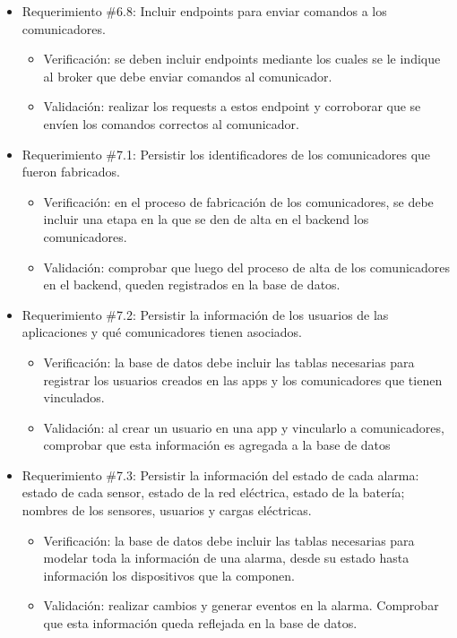 \documentclass[
11pt, %
]{charter}
\begin{document}
\begin{itemize}
	\item Requerimiento \#6.8: Incluir endpoints para enviar comandos a los comunicadores.
	\begin{itemize}
		\item Verificación: se deben incluir endpoints mediante los cuales se le indique al broker que debe enviar comandos al comunicador.
		\item Validación: realizar los requests a estos endpoint y corroborar que se envíen los comandos correctos al comunicador.
	\end{itemize}
			
	\item Requerimiento \#7.1: Persistir los identificadores de los comunicadores que fueron fabricados.
	\begin{itemize}
		\item Verificación: en el proceso de fabricación de los comunicadores, se debe incluir una etapa en la que se den de alta en el backend los comunicadores.
		\item Validación: comprobar que luego del proceso de alta de los comunicadores en el backend, queden registrados en la base de datos.
	\end{itemize}
			
	\item Requerimiento \#7.2: Persistir la información de los usuarios de las aplicaciones y qué comunicadores tienen asociados.
	\begin{itemize}
		\item Verificación: la base de datos debe incluir las tablas necesarias para registrar los usuarios creados en las apps y los comunicadores que tienen vinculados.
		\item Validación: al crear un usuario en una app y vincularlo a comunicadores, comprobar que esta información es agregada a la base de datos
	\end{itemize}
			
	\item Requerimiento \#7.3: Persistir la información del estado de cada alarma: estado de cada sensor, estado de la red eléctrica, estado de la batería; nombres de los sensores, usuarios y cargas eléctricas.
	\begin{itemize}
		\item Verificación: la base de datos debe incluir las tablas necesarias para modelar toda la información de una alarma, desde su estado hasta información los dispositivos que la componen.
		\item Validación: realizar cambios y generar eventos en la alarma. Comprobar que esta información queda reflejada en la base de datos.
	\end{itemize}
		
\end{itemize}
\end{document}
